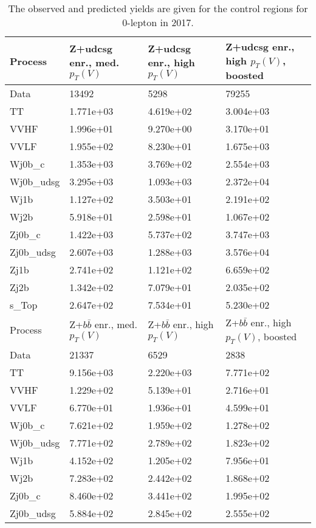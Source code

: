 \begin{table}
\centering
\caption[2017 0-lepton control region yields]{
                  The observed and predicted yields are given for the
                  control regions for 0-lepton in 2017.
                  }
{\footnotesize
\begin{tabularx}{0.8\textwidth}{|X|X|X|X|}
\hline
Process & Z+udcsg enr., med. $p_{T}(V)$ & Z+udcsg enr., high $p_{T}(V)$ & Z+udcsg enr., high $p_{T}(V)$, boosted \\
\hline
Data & 13492 & 5298 & 79255 \\
\hline
TT & 1.771e+03 & 4.619e+02 & 3.004e+03 \\
VVHF & 1.996e+01 & 9.270e+00 & 3.170e+01 \\
VVLF & 1.955e+02 & 8.230e+01 & 1.675e+03 \\
Wj0b\_c & 1.353e+03 & 3.769e+02 & 2.554e+03 \\
Wj0b\_udsg & 3.295e+03 & 1.093e+03 & 2.372e+04 \\
Wj1b & 1.127e+02 & 3.503e+01 & 2.191e+02 \\
Wj2b & 5.918e+01 & 2.598e+01 & 1.067e+02 \\
Zj0b\_c & 1.422e+03 & 5.737e+02 & 3.747e+03 \\
Zj0b\_udsg & 2.607e+03 & 1.288e+03 & 3.576e+04 \\
Zj1b & 2.741e+02 & 1.121e+02 & 6.659e+02 \\
Zj2b & 1.342e+02 & 7.079e+01 & 2.035e+02 \\
s\_Top & 2.647e+02 & 7.534e+01 & 5.230e+02 \\
\hline
\hline
Process & Z+$b\bar{b}$ enr., med. $p_{T}(V)$ & Z+$b\bar{b}$ enr., high $p_{T}(V)$ & Z+$b\bar{b}$ enr., high $p_{T}(V)$, boosted \\
\hline
Data & 21337 & 6529 & 2838 \\
\hline
TT & 9.156e+03 & 2.220e+03 & 7.771e+02 \\
VVHF & 1.229e+02 & 5.139e+01 & 2.716e+01 \\
VVLF & 6.770e+01 & 1.936e+01 & 4.599e+01 \\
Wj0b\_c & 7.621e+02 & 1.959e+02 & 1.278e+02 \\
Wj0b\_udsg & 7.771e+02 & 2.789e+02 & 1.823e+02 \\
Wj1b & 4.152e+02 & 1.205e+02 & 7.956e+01 \\
Wj2b & 7.283e+02 & 2.442e+02 & 1.868e+02 \\
Zj0b\_c & 8.460e+02 & 3.441e+02 & 1.995e+02 \\
Zj0b\_udsg & 5.884e+02 & 2.845e+02 & 2.555e+02 \\

\end{tabularx}}
\end{table}
